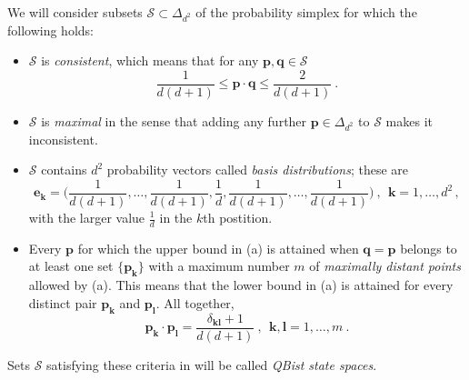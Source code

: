 \documentclass[letterpaper,11pt]{article}
\begin{document}
We will consider subsets $\mathcal{S}\subset\Delta_{d^2}$  of the probability simplex for which the following holds:
%
     \begin{itemize}
     \item[(a) ]
$\mathcal{S}$ is \emph{consistent}, which means that for any $\mathbf p, \mathbf q \in \mathcal{S}$
%
\begin{equation} \label{inequality}
   \frac{1}{d(d+1)} \leq \mathbf{p\cdot q} \leq \frac{2}{d(d+1)} \ .
\end{equation}
%

     \item[(b) ]
$\mathcal{S}$ is \emph{maximal} in the sense that adding any further $\mathbf p\in\Delta_{d^2}$ to $\mathcal{S}$ makes it inconsistent.

     \item[(c) ]
$\mathcal{S}$ contains $d^2$ probability vectors called \emph{basis distributions}; these are
%
\begin{equation} \label{basisdistribution}
\textstyle{
  \mathbf{e_k}=\big(\frac{1}{d(d+1)},\dots,\frac{1}{d(d+1)},\frac{1}{d},\frac{1}{d(d+1)},\dots,\frac{1}{d(d+1)}\big)}
    \ , \ \ \mathbf{k}=1,\dots,d^2 \, ,
\end{equation}
%
with the larger value $\frac{1}{d}$ in the $k$th postition.

     \item[(d) ]
Every $\mathbf p$ for which the upper bound in (a) is attained when $\mathbf{q=p}$ belongs to at least one set $\{\mathbf{p_k}\}$ with a maximum number $m$ of \emph{maximally distant points} allowed by (a). This means that the lower bound in (a) is attained for every distinct pair $\mathbf{p_k}$ and $\mathbf{p_l}$.  All together,
%
\begin{equation} \label{maxdistant}
  \mathbf{p_k\cdot p_l}= \frac{\delta_\mathbf{kl}+1}{d(d+1)} \ , \ \ \mathbf{k,l}=1,\dots,m \ .
\end{equation}
%
     \end{itemize}

Sets $\mathcal{S}$ satisfying these criteria in will be called {\it QBist state spaces}.

\vspace{2mm}
\end{document}
